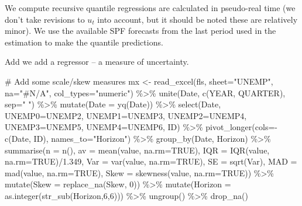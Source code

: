 \documentclass[
  letterpaper,
]{book}
\newenvironment{Shaded}{\begin{snugshade}}{\end{snugshade}}
\newcommand{\AttributeTok}[1]{\textcolor[rgb]{0.40,0.45,0.13}{#1}}
\newcommand{\CommentTok}[1]{\textcolor[rgb]{0.37,0.37,0.37}{#1}}
\newcommand{\ConstantTok}[1]{\textcolor[rgb]{0.56,0.35,0.01}{#1}}
\newcommand{\DecValTok}[1]{\textcolor[rgb]{0.68,0.00,0.00}{#1}}
\newcommand{\FloatTok}[1]{\textcolor[rgb]{0.68,0.00,0.00}{#1}}
\newcommand{\FunctionTok}[1]{\textcolor[rgb]{0.28,0.35,0.67}{#1}}
\newcommand{\NormalTok}[1]{\textcolor[rgb]{0.00,0.23,0.31}{#1}}
\newcommand{\OtherTok}[1]{\textcolor[rgb]{0.00,0.23,0.31}{#1}}
\newcommand{\SpecialCharTok}[1]{\textcolor[rgb]{0.37,0.37,0.37}{#1}}
\newcommand{\StringTok}[1]{\textcolor[rgb]{0.13,0.47,0.30}{#1}}
\begin{document}
We compute recursive quantile regressions are calculated in pseudo-real
time (we don't take revisions to \(u_t\) into account, but it should be
noted these are relatively minor). We use the available SPF forecasts
from the last period used in the estimation to make the quantile
predictions.

Add we add a regressor -- a measure of uncertainty.

\begin{Shaded}
\begin{Highlighting}[]
\CommentTok{\# Add some scale/skew measures}
\NormalTok{mx }\OtherTok{\textless{}{-}} \FunctionTok{read\_excel}\NormalTok{(fls, }\AttributeTok{sheet=}\StringTok{"UNEMP"}\NormalTok{, }\AttributeTok{na=}\StringTok{"\#N/A"}\NormalTok{, }\AttributeTok{col\_types=}\StringTok{"numeric"}\NormalTok{) }\SpecialCharTok{\%\textgreater{}\%}
  \FunctionTok{unite}\NormalTok{(Date, }\FunctionTok{c}\NormalTok{(YEAR, QUARTER), }\AttributeTok{sep=}\StringTok{" "}\NormalTok{) }\SpecialCharTok{\%\textgreater{}\%}
  \FunctionTok{mutate}\NormalTok{(}\AttributeTok{Date =} \FunctionTok{yq}\NormalTok{(Date)) }\SpecialCharTok{\%\textgreater{}\%}
  \FunctionTok{select}\NormalTok{(Date, }\AttributeTok{UNEMP0=}\NormalTok{UNEMP2, }\AttributeTok{UNEMP1=}\NormalTok{UNEMP3, }\AttributeTok{UNEMP2=}\NormalTok{UNEMP4, }\AttributeTok{UNEMP3=}\NormalTok{UNEMP5, }\AttributeTok{UNEMP4=}\NormalTok{UNEMP6, ID) }\SpecialCharTok{\%\textgreater{}\%}
  \FunctionTok{pivot\_longer}\NormalTok{(}\AttributeTok{cols=}\SpecialCharTok{{-}}\FunctionTok{c}\NormalTok{(Date, ID), }\AttributeTok{names\_to=}\StringTok{"Horizon"}\NormalTok{) }\SpecialCharTok{\%\textgreater{}\%}
  \FunctionTok{group\_by}\NormalTok{(Date, Horizon) }\SpecialCharTok{\%\textgreater{}\%}
  \FunctionTok{summarise}\NormalTok{(}\AttributeTok{n    =} \FunctionTok{n}\NormalTok{(),}
            \AttributeTok{av   =} \FunctionTok{mean}\NormalTok{(value, }\AttributeTok{na.rm=}\ConstantTok{TRUE}\NormalTok{),}
            \AttributeTok{IQR  =} \FunctionTok{IQR}\NormalTok{(value,  }\AttributeTok{na.rm=}\ConstantTok{TRUE}\NormalTok{)}\SpecialCharTok{/}\FloatTok{1.349}\NormalTok{,}
            \AttributeTok{Var  =} \FunctionTok{var}\NormalTok{(value,  }\AttributeTok{na.rm=}\ConstantTok{TRUE}\NormalTok{),}
            \AttributeTok{SE   =} \FunctionTok{sqrt}\NormalTok{(Var),}
            \AttributeTok{MAD  =} \FunctionTok{mad}\NormalTok{(value,  }\AttributeTok{na.rm=}\ConstantTok{TRUE}\NormalTok{),}
            \AttributeTok{Skew =} \FunctionTok{skewness}\NormalTok{(value, }\AttributeTok{na.rm=}\ConstantTok{TRUE}\NormalTok{)) }\SpecialCharTok{\%\textgreater{}\%}
  \FunctionTok{mutate}\NormalTok{(}\AttributeTok{Skew =} \FunctionTok{replace\_na}\NormalTok{(Skew, }\DecValTok{0}\NormalTok{)) }\SpecialCharTok{\%\textgreater{}\%}
  \FunctionTok{mutate}\NormalTok{(}\AttributeTok{Horizon =} \FunctionTok{as.integer}\NormalTok{(}\FunctionTok{str\_sub}\NormalTok{(Horizon,}\DecValTok{6}\NormalTok{,}\DecValTok{6}\NormalTok{))) }\SpecialCharTok{\%\textgreater{}\%}
  \FunctionTok{ungroup}\NormalTok{() }\SpecialCharTok{\%\textgreater{}\%}
  \FunctionTok{drop\_na}\NormalTok{()}


\end{Highlighting}
\end{Shaded}
\end{document}
